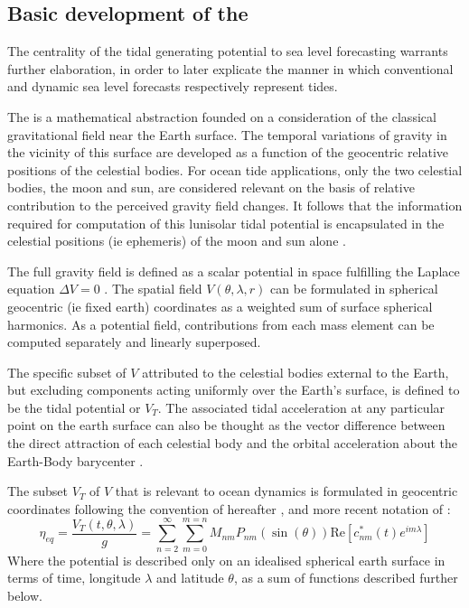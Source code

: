 \subsection{Basic development of the \ATGP{}}  \label{sec:basic_potential}
The centrality of the tidal generating potential to sea level forecasting warrants further elaboration, in order to later explicate the manner in which conventional and dynamic sea level forecasts respectively represent tides. 

The \ATGP{} is a mathematical abstraction founded on a consideration of the classical gravitational field near the Earth surface. The temporal variations of gravity in the vicinity of this surface are developed as a function of the geocentric relative positions of the celestial bodies.
For ocean tide applications, only the two celestial bodies, the moon and sun, are considered relevant on the basis of relative contribution to the perceived gravity field changes. It follows that the information required for computation of this lunisolar tidal potential is encapsulated in the celestial positions (ie ephemeris) of the moon and sun alone \citep{agnew2015}.


The full gravity field is defined as a scalar potential in space fulfilling the Laplace equation $\Delta V=0$ \citep[sec 5.3.1]{Urban:2013vl}.  The spatial field $V(\theta,\lambda,r)$ can be formulated in spherical geocentric (ie fixed earth) coordinates as a weighted sum of surface spherical harmonics. As a potential field, contributions from each mass element can be computed separately and linearly superposed.

The specific subset of $V$ attributed to the celestial bodies external to the Earth, but excluding components acting uniformly over the Earth's surface, is defined to be the tidal potential \ATGP{} or $V_T$.
The associated tidal acceleration at any particular point on the earth surface can also be thought as the vector difference between the direct attraction of each celestial body and the orbital acceleration about the Earth-Body barycenter \citep{Wenzel:1997kn}.


The subset $V_T$ of $V$ that is relevant to ocean dynamics is formulated in geocentric coordinates following the convention of \citep{Cartwright:1973em} hereafter \CTE{}, and more recent notation of \citep{Desai:2006wo}:
\begin{equation}
    \eta_{eq} = \frac{V_T(t,\theta,\lambda) }{g} = \sum_{n=2}^{\infty} \sum_{m=0}^{m=n} M_{nm} P_{nm}( \sin(\theta) ) \text{Re} \left [ c^{*}_{nm}(t) e^{im\lambda} \right ]
    \label{eq:VT}
\end{equation}
Where the potential is described only on an idealised spherical earth surface in terms of time, longitude $\lambda$ and latitude $\theta$, as a sum of functions described further below. 

